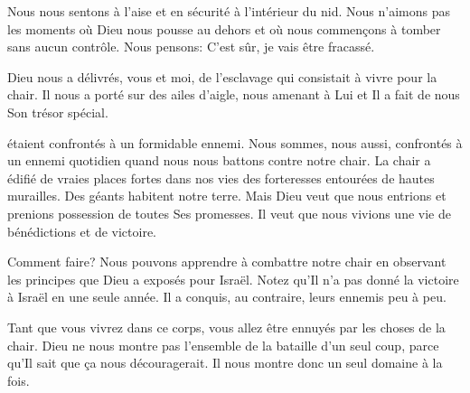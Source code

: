 Nous nous sentons à l'aise et en sécurité à l'intérieur du nid.
 Nous n'aimons pas les moments où Dieu nous pousse au dehors
 et où nous commençons à tomber sans aucun contrôle.
 Nous pensons: \og C'est sûr, je vais être fracassé. \fg{}


Dieu nous a délivrés, vous et moi, de l'esclavage
 qui consistait à vivre pour la chair.
 Il nous a porté sur des ailes d'aigle, nous amenant à Lui
 et Il a fait de nous Son trésor spécial. 

\dvrule







 étaient confrontés à un formidable ennemi.
 Nous sommes, nous aussi, confrontés à un ennemi quotidien
 quand nous nous battons contre notre chair.
 La chair a édifié de vraies places fortes dans nos vies
 \ocadr{}des forteresses entourées de hautes murailles.
 Des géants habitent notre terre.
 Mais Dieu veut que nous entrions et prenions possession
 de toutes Ses promesses.
 Il veut que nous vivions une vie de bénédictions et de victoire.

Comment faire? Nous pouvons apprendre à combattre notre chair
 en observant les principes que Dieu a exposés pour Israël.
 Notez qu'Il n'a pas donné la victoire à Israël en une seule année.
 Il a conquis, au contraire, leurs ennemis peu à peu.


Tant que vous vivrez dans ce corps,
 vous allez être ennuyés par les choses de la chair.
 Dieu ne nous montre pas l'ensemble de la bataille d'un seul coup,
 parce qu'Il sait que ça nous découragerait.
 Il nous montre donc un seul domaine à la fois.

